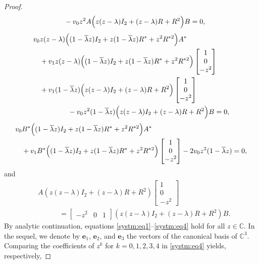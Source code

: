 \documentclass[12pt, reqno]{amsart}
\theoremstyle{definition}
\theoremstyle{remark}
\numberwithin{equation}{section}
\begin{document}
\begin{proof}
\begin{align}
		&\qquad  - v_0 z^2 A \Bigl( z(z-\lambda)I_2 + (z-\lambda)R + R^2 \Bigr) B = 0, \label{systm:eq1}	
	\end{align}
	\begin{align}
		v_0 &z(z-\lambda)  \Bigl( (1-\overline{\lambda}z)I_2 + z(1-\overline{\lambda}z)R^* + z^2 R^{*2} \Bigr) A^* \nonumber \\ 
		& + v_1 z(z-\lambda) \Bigl( (1-\overline{\lambda}z)I_2 + z(1-\overline{\lambda}z)R^* + z^2 R^{*2} \Bigr) \begin{bmatrix} 1\\0\\-z^2 \end{bmatrix} \nonumber \\
		& + v_1 (1-\overline{\lambda}z) \Bigl( z(z-\lambda)I_2 + (z-\lambda)R + R^{2} \Bigr) \begin{bmatrix} 1\\0\\-z^2 \end{bmatrix} \label{systm:eq2} \\
		& \qquad \qquad - v_0 z^2 (1-\overline{\lambda}z) \Bigl( z(z-\lambda)I_2 + (z-\lambda)R + R^2 \Bigr)B = 0,\nonumber 	
	\end{align}
	\begin{align}
		v_0& B^*  \Bigl( (1-\overline{\lambda}z)I_2 + z(1-\overline{\lambda}z)R^* + z^2 R^{*2} \Bigr) A^* \nonumber \\
		& + v_1 B^* \Bigl( (1-\overline{\lambda}z)I_2 + z(1-\overline{\lambda}z)R^* + z^2 R^{*2} \Bigr) \begin{bmatrix} 1\\0\\-z^2 \end{bmatrix} - 2v_0 z^2 (1-\overline{\lambda}z) = 0, \label{systm:eq3}	
	\end{align}
	and
	\begin{align}
		& A \left( z(z-\lambda)I_2 + (z-\lambda)R + R^2 \right) \begin{bmatrix} 1\\0\\-z^2 \end{bmatrix} \nonumber \\ 
		& \quad  \qquad = \begin{bmatrix} -z^2 & 0 & 1 \end{bmatrix} \left( z(z-\lambda)I_2 + (z-\lambda)R + R^2 \right) B. \label{systm:eq4} 
	\end{align}
	By analytic continuation, equations \eqref{systm:eq1}--\eqref{systm:eq4} hold for all $z\in \mathbb{C}$. In the sequel, we denote by $\mathbf{e}_1$, $\mathbf{e}_2$, and $\mathbf{e}_3$ the vectors of the canonical basis of $\mathbb{C}^3$. Comparing the coefficients of $z^k$ for $k=0,1,2,3,4$ in \eqref{systm:eq4} yields, respectively,

\end{proof}
\end{document}
